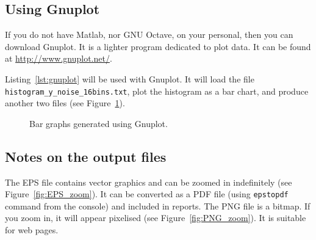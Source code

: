 \documentclass[english,a4paper,12pt,oneside]{article}
\begin{document}
\subsection*{Using Gnuplot}

If you do not have Matlab, nor GNU Octave, on your personal, then you can download Gnuplot. 
It is a lighter program dedicated to plot data. 
It can be found at \url{http://www.gnuplot.net/}. 


Listing~\ref{lst:gnuplot} will be used with Gnuplot. It will load the file \verb+histogram_y_noise_16bins.txt+, plot the histogram as a bar chart,  and produce another two files (see Figure~\ref{fig:gnuplot}).


\begin{figure}[!h]
\centering
{}\hfill
{}
\caption{\label{fig:gnuplot}Bar graphs generated using Gnuplot.}
\end{figure}

\subsection*{Notes on the output files}

The EPS file contains vector graphics and can be zoomed in indefinitely (see Figure~\ref{fig:EPS_zoom}). 
It can be converted as a PDF file (using \verb+epstopdf+ command from the console) and included in reports. 
The PNG file is a bitmap. If you zoom in, it will appear pixelised (see Figure~\ref{fig:PNG_zoom}). 
It is suitable for web pages.
\end{document}

